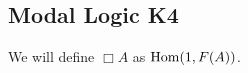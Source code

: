 \subsection{Modal Logic K4}
\begin{definition}
We will define $\Box A$ as $\mathrm{Hom}(1, F(A))$.
\end{definition}